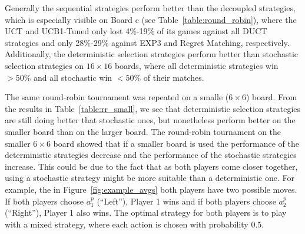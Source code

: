 \documentclass{article}
\begin{document}
Generally the sequential strategies perform better than the decoupled strategies, which is especially visible on Board c (see Table~\ref{table:round_robin}), where the UCT and UCB1-Tuned only lost 4\%-19\% of its games against all DUCT strategies and only 28\%-29\% against EXP3 and Regret Matching, respectively. 
Additionally, the deterministic selection strategies perform better than stochastic selection strategies on $16\times16$ boards, where all deterministic strategies win $>50\%$ and all stochastic win $<50\%$ of their matches. 

%
The same round-robin tournament was repeated on a smalle ($6 \times 6$) board. 
From the results in Table~\ref{table:rr_small}, we see that deterministic selection strategies are still doing better that stochastic 
ones, but nonetheless perform better on the smaller board than on the larger board.
The round-robin tournament on the smaller $6 \times 6$ board showed that if a smaller board is used the performance of the deterministic strategies decrease and the performance of the stochastic strategies increase. 
This could be due to the fact that as both players come closer together, using a stochastic strategy might be more suitable than a deterministic one.
For example, the in Figure~\ref{fig:example_avgs} both players have two possible moves. If both players choose $a^{p}_{1}$ (``Left''), Player 1 wins and if both players choose $a^{p}_{2}$ (``Right''), Player 1 also wins. The optimal strategy for both players is to play with a mixed strategy, where each action is chosen with probability $0.5$. 


\end{document}
